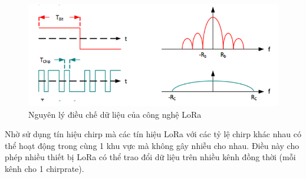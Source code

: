 \begin{center}
    \begin{figure}[h]
    \begin{center}
     \includegraphics[scale=0.5]{image/hinh2_1}
    \end{center}
    \caption{Nguyên lý điều chế dữ liệu của công nghệ LoRa}
    \label{refhinh2_1}
    \end{figure}
\end{center}
\par
Nhờ sử dụng tín hiệu chirp  mà các tín hiệu LoRa với các tỷ lệ chirp khác nhau có thể hoạt động trong cùng 1 khu vực mà không gây nhiễu cho nhau. Điều này cho phép nhiều thiết bị LoRa có thể trao đổi dữ liệu trên nhiều kênh đồng thời (mỗi kênh cho 1 chirprate).

